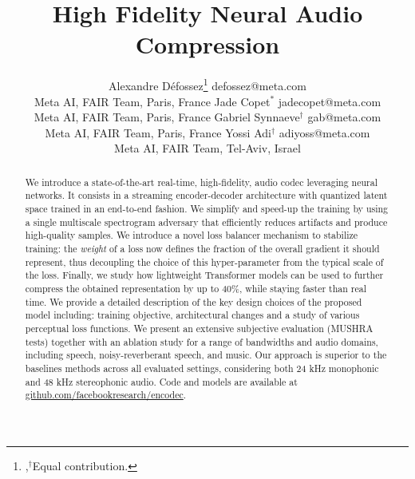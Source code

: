 \documentclass[10pt]{article} %
\title{High Fidelity Neural Audio Compression}
\author{\name Alexandre D\'efossez\thanks{,$^{\dagger}$Equal contribution.} \email defossez@meta.com \\
      \addr Meta AI, FAIR Team, Paris, France
      \AND
      \name Jade Copet$^{*}$ \email jadecopet@meta.com \\
      \addr Meta AI, FAIR Team, Paris, France
      \AND
      \name Gabriel Synnaeve$^{\dagger}$ \email gab@meta.com\\
      \addr Meta AI, FAIR Team, Paris, France
      \AND
      \name Yossi Adi$^{\dagger}$ \email adiyoss@meta.com \\
      \addr Meta AI, FAIR Team, Tel-Aviv, Israel
}
\begin{document}
\maketitle

\begin{abstract}
We introduce a state-of-the-art real-time, high-fidelity, audio codec leveraging neural networks. It consists in a streaming encoder-decoder architecture with quantized latent space trained in an end-to-end fashion.
We simplify and speed-up the training by using a single multiscale spectrogram adversary that efficiently reduces artifacts and produce high-quality samples.
We introduce a novel loss balancer mechanism to stabilize training: the \emph{weight} of a loss
now defines the fraction of the overall gradient it should represent, thus decoupling the choice of this
hyper-parameter from the typical scale of the loss. Finally, we study how lightweight Transformer models
can be used to further compress the obtained representation by up to 40\%, while staying faster than real time.
We provide a detailed description of the key design choices of the proposed model including: training objective, architectural changes and a study of various perceptual loss functions. We present an extensive subjective evaluation (MUSHRA tests) together with an ablation study for a range of bandwidths and audio domains, including speech, noisy-reverberant speech, and music. Our approach is superior to the baselines methods across all evaluated settings, considering both 24 kHz monophonic and 48 kHz stereophonic audio. Code and models are available at \href{https://github.com/facebookresearch/encodec}{github.com/facebookresearch/encodec}.


\end{abstract}



 


\clearpage




\clearpage

\end{document}
